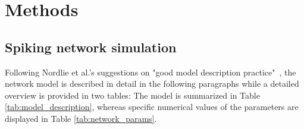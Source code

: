 \section{Methods}
\label{sec:methods}

\subsection{Spiking network simulation}
\label{sub:methods_simulation}
Following Nordlie et al.'s suggestions on 
"good model description practice"~\cite{nordlie2009},
the network model is described in detail in the following paragraphs while a detailed 
overview is provided in two tables: The model is summarized in Table 
\ref{tab:model_description}, 
whereas specific numerical values of the parameters are displayed in Table 
\ref{tab:network_params}. 


